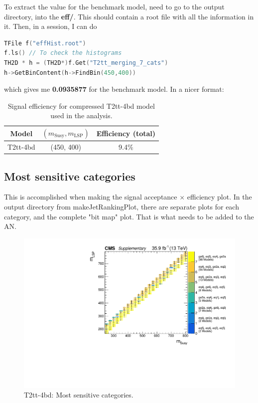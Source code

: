 To extract the value for the benchmark model, need to go to the output directory, into the \textbf{eff/}. This should contain a root file with all the information in it. Then, in a \ROOT session, I can do

\begin{lstlisting}[belowskip=-0.7cm, language=C++, numbers=none]
TFile f("effHist.root")
f.ls() // To check the histograms
TH2D * h = (TH2D*)f.Get("T2tt_merging_7_cats")
h->GetBinContent(h->FindBin(450,400))
\end{lstlisting}

which gives me \textbf{0.0935877} for the benchmark model. In a nicer format:

\begin{table}[H]
    \caption{Signal efficiency for compressed T2tt-4bd model used in the analysis.}
    \label{tab:sig-effT2ttBenchmark}
    \centering
    \begin{tabular}{ ccc }
        \hline \hline
        Model & $(m_{\mathrm{Susy}},m_{\mathrm{LSP}})$ & Efficiency (total) \\
        \hline
        T2tt-4bd & (450, 400) & 9.4\% \\
        \hline \hline
        \end{tabular}
        \end{table}


\subsection{Most sensitive \texorpdfstring{\njet}{njet} categories}

This is accomplished when making the signal acceptance $\times$ efficiency plot. In the output directory from makeJetRankingPlot, there are separate plots for each \njet category, and the complete "bit map" plot. That is what needs to be added to the AN.

\begin{figure}[H]
\centering
\includegraphics[width=120mm]{./sec31/T2tt_bitMap_improved.pdf}
\caption{T2tt-4bd: Most sensitive categories.}
\end{figure}


